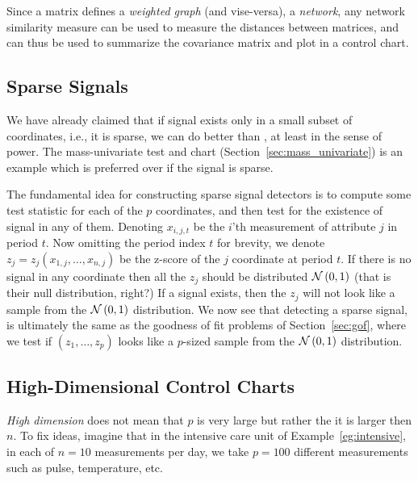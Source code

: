 \begin{extra}
Since a matrix defines a \emph{weighted graph} (and vise-versa), \aka a \emph{network}, any network similarity measure can be used to measure the distances between matrices, and can thus be used to summarize the covariance matrix and plot in a control chart.
\end{extra}





\subsection{Sparse Signals}

We have already claimed that if signal exists only in a small subset of coordinates, i.e., it is sparse, we can do better than \tsq, at least in the sense of power.
The mass-univariate test and chart (Section~\ref{sec:mass_univariate}) is an example which is preferred over \tsq if the signal is sparse.



\begin{extra}

The fundamental idea for constructing sparse signal detectors is to compute some test statistic for each of the $p$ coordinates, and then test for the existence of signal in any of them. 
Denoting $x_{i,j,t}$ be the $i$'th measurement of attribute $j$ in period $t$.
Now omitting the period index $t$ for brevity, we denote $z_j=z_j(x_{1,j},\dots,x_{n,j})$ be the z-score of the $j$ coordinate at period $t$. 
If there is no signal in any coordinate then all the $z_j$ should be distributed $\mathcal{N}\left(0,1\right)$ (that is their null distribution, right?)
If a signal exists, then the $z_j$ will not look like a sample from the $\mathcal{N}\left(0,1\right)$ distribution. 
We now see that detecting a sparse signal, is ultimately the same as the goodness of fit problems of Section~\ref{sec:gof}, where we test if $(z_1,\dots,z_p)$ looks like a $p$-sized sample from the $\mathcal{N}\left(0,1\right)$ distribution.

\end{extra}





\subsection{High-Dimensional Control Charts}

\emph{High dimension} does not mean that $p$ is very large but rather the it is larger then $n$.
To fix ideas, imagine that in the intensive care unit of Example~\ref{eg:intensive}, in each of $n=10$ measurements per day, we take $p=100$ different measurements such as pulse, temperature, etc.


